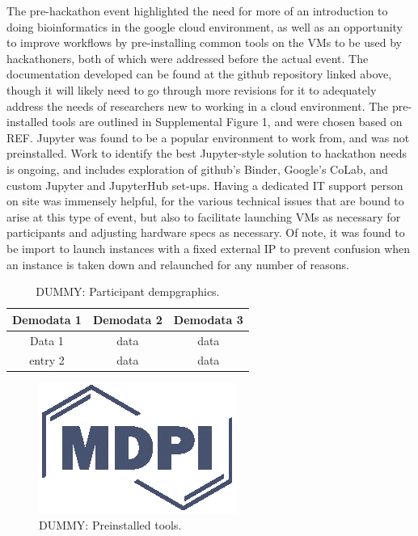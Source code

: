   The pre-hackathon event highlighted the need for more of an introduction to
  doing bioinformatics in the google cloud environment, as well as an
  opportunity to improve workflows by pre-installing common tools on the VMs to
  be used by hackathoners, both of which were addressed before the actual
  event. The documentation developed can be found at the github repository
  linked above, though it will likely need to go through more revisions for it
  to adequately address the needs of researchers new to working in a cloud
  environment. The pre-installed tools are outlined in Supplemental Figure 1,
  and were chosen based on REF. Jupyter was found to be a popular environment
  to work from, and was not preinstalled. Work to identify the best
  Jupyter-style solution to hackathon needs is ongoing, and includes
  exploration of github's Binder, Google's CoLab, and custom Jupyter and
  JupyterHub set-ups. Having a dedicated IT support person on site was
  immensely helpful, for the various technical issues that are bound to arise
  at this type of event, but also to facilitate launching VMs as necessary for
  participants and adjusting hardware specs as necessary. Of note, it was found
  to be import to launch instances with a fixed external IP to prevent
  confusion when an instance is taken down and relaunched for any number of
  reasons.

  \begin{table}
    \caption{DUMMY: Participant dempgraphics. \label{fig:participants}}
    \centering
    \begin{tabular}{ccc}
    \toprule
    \textbf{Demodata 1}  & \textbf{Demodata 2}  & \textbf{Demodata 3} \\\midrule
                Data 1   & data                 & data                \\
               entry 2   & data                 & data                \\
    \bottomrule
    \end{tabular}
  \end{table}

  \begin{figure}
    \centering
    \includegraphics{Definitions/logo-mdpi}
    \caption{DUMMY: Preinstalled tools.
            \label{fig:preinstalled_tools}}
  \end{figure}

